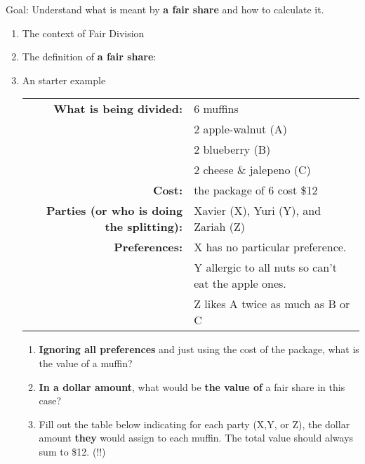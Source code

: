 \documentclass[12pt]{article}
\begin{document}
Goal: Understand what is meant by \textbf{a fair share} and how to calculate it.
\begin{enumerate}
\item The context of Fair Division
\vfill
\item The definition of \textbf{a fair share}:\\
\vfill
\newpage
\item An starter example \\


\begin{tabular}{rl}
\textbf{What is being divided:}& 6 muffins \\
&2 apple-walnut (A)\\
&2 blueberry (B)\\
&2 cheese \& jalepeno (C)\\
\textbf{Cost:}& the package of 6 cost \$12\\
\textbf{Parties (or who is doing the splitting):}& Xavier (X), Yuri (Y), and Zariah (Z) \\
\textbf{Preferences:}& X has no particular preference.\\
& Y allergic to all nuts so can't eat the apple ones.\\
& Z likes A twice as much as B or C\\
\end{tabular}

	\begin{enumerate}
	\item \textbf{Ignoring all preferences} and just using the cost of the package, what is the value of a muffin?
	\vfill
	\item \textbf{In a dollar amount}, what would be \textbf{the value of} a fair share in this case?
	\vfill
	\item Fill out the table below indicating for each party (X,Y, or Z), the dollar amount \textbf{they} would assign to each muffin. The total value should always sum to \$12. (!!)\\
	

\end{enumerate}
\end{enumerate}
\end{document}
